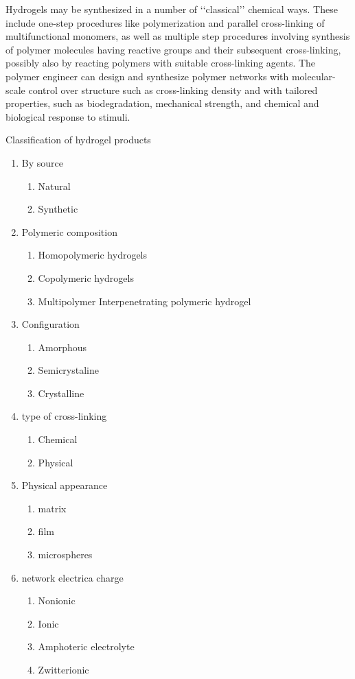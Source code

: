 \documentclass[../../main-notes.tex]{subfiles}
\begin{document}
Hydrogels may be synthesized in a number of ‘‘classical’’ chemical ways. 
These include one-step procedures like polymerization and parallel cross-linking of multifunctional monomers, as well as multiple step procedures involving synthesis of polymer molecules having reactive groups and their subsequent cross-linking, possibly also by reacting polymers with suitable cross-linking agents. 
The polymer engineer can design and synthesize polymer networks with molecular-scale control over structure such as cross-linking density and with tailored properties, such as biodegradation, mechanical strength, and chemical and biological response to stimuli.


Classification of hydrogel products 

\begin{enumerate}
    \item By source 
    \begin{enumerate}
        \item Natural
        \item Synthetic
    \end{enumerate}
    \item Polymeric composition
    \begin{enumerate}
        \item Homopolymeric hydrogels 
        \item Copolymeric hydrogels 
        \item Multipolymer Interpenetrating polymeric hydrogel 
    \end{enumerate}
    \item Configuration
    \begin{enumerate}
        \item Amorphous
        \item Semicrystaline 
        \item  Crystalline
    \end{enumerate}
    \item type of cross-linking 
    \begin{enumerate}
        \item Chemical
        \item Physical
    \end{enumerate}
    \item Physical appearance
    \begin{enumerate}
        \item matrix
        \item film
        \item microspheres
    \end{enumerate}
    \item network electrica charge
    \begin{enumerate}
        \item Nonionic
        \item Ionic
        \item Amphoteric electrolyte
        \item Zwitterionic
    \end{enumerate}
\end{enumerate}
\end{document}
